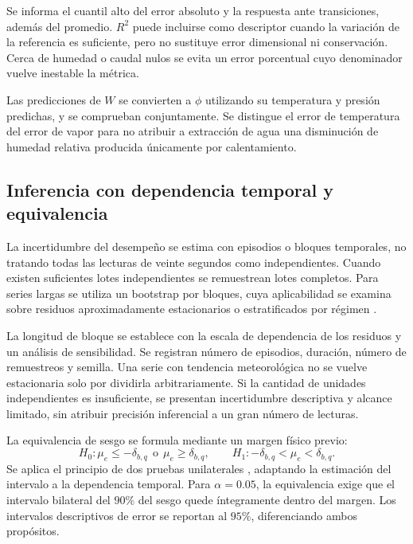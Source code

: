 Se informa el cuantil alto del error absoluto y la respuesta ante transiciones, además del promedio. $R^2$ puede incluirse como descriptor cuando la variación de la referencia es suficiente, pero no sustituye error dimensional ni conservación. Cerca de humedad o caudal nulos se evita un error porcentual cuyo denominador vuelve inestable la métrica.

Las predicciones de $W$ se convierten a $\phi$ utilizando su temperatura y presión predichas, y se comprueban conjuntamente. Se distingue el error de temperatura del error de vapor para no atribuir a extracción de agua una disminución de humedad relativa producida únicamente por calentamiento.

\subsection{Inferencia con dependencia temporal y equivalencia}
\label{met:estadistica}

La incertidumbre del desempeño se estima con episodios o bloques temporales, no tratando todas las lecturas de veinte segundos como independientes. Cuando existen suficientes lotes independientes se remuestrean lotes completos. Para series largas se utiliza un bootstrap por bloques, cuya aplicabilidad se examina sobre residuos aproximadamente estacionarios o estratificados por régimen \cite{kunsch1989}.

La longitud de bloque se establece con la escala de dependencia de los residuos y un análisis de sensibilidad. Se registran número de episodios, duración, número de remuestreos y semilla. Una serie con tendencia meteorológica no se vuelve estacionaria solo por dividirla arbitrariamente. Si la cantidad de unidades independientes es insuficiente, se presentan incertidumbre descriptiva y alcance limitado, sin atribuir precisión inferencial a un gran número de lecturas.

La equivalencia de sesgo se formula mediante un margen físico previo:
\begin{equation}
H_0:\mu_e\leq-\delta_{b,q}\ \ \text{o}\ \
\mu_e\geq\delta_{b,q},
\qquad
H_1:-\delta_{b,q}<\mu_e<\delta_{b,q}.
\label{met:equivalencia}
\end{equation}
Se aplica el principio de dos pruebas unilaterales \cite{schuirmann1987}, adaptando la estimación del intervalo a la dependencia temporal. Para $\alpha=0.05$, la equivalencia exige que el intervalo bilateral del $90\%$ del sesgo quede íntegramente dentro del margen. Los intervalos descriptivos de error se reportan al $95\%$, diferenciando ambos propósitos.

